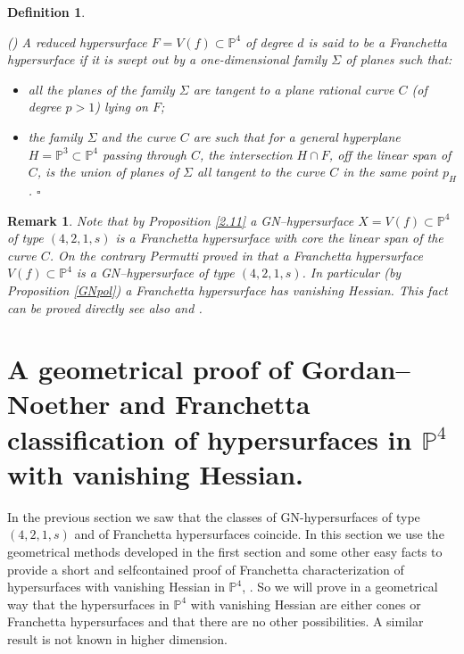 \documentclass[11pt,a4paper]{amsart}
\newtheorem{rem}[theorem]{Remark}
\newtheorem{defi}[theorem]{Definition}
\newcommand{\erem}{\hfill $\square$}
\newcommand{\PP}{ \mathbb{P}}
\begin{document}
\begin{defi}\label{Frhyp}{\em (\cite{Franchetta})
A reduced hypersurface $F=V(f)\subset \mathbb{P}^4$ of degree $d$ is said to be a {\it Franchetta hypersurface} if it is
swept out by a one-dimensional family $\Sigma$ of planes such
that:
\begin{itemize}
\item all the planes of the family $\Sigma$ are tangent to a plane
rational curve $C$  (of degree $p>1$) lying on $F$; \item the
family $\Sigma$ and the curve $C$ are such that for a general
hyperplane $H=\PP^3\subset\PP^4$ passing through $C$, the
intersection $H\cap F$, off the linear span of $C$, is the union
of planes of $\Sigma$ all tangent to the curve $C$ in the same
point $p_H$. \erem\end{itemize} }\end{defi}

\begin{rem}\label{remark: Franchetta equvalent to GN}{\em
Note that by Proposition \ref{2.11}  a GN--hypersurface
$X=V(f)\subset\mathbb{P}^4$ of type $(4,2,1,s)$ is a Franchetta
hypersurface with core the linear span of the curve $C$. On the
contrary Permutti proved in \cite{Permutti1} that  a Franchetta
hypersurface $V(f)\subset\mathbb{P}^4$ is a GN--hypersurface of
type $(4,2,1,s)$. In particular (by Proposition \ref{GNpol}) a
Franchetta hypersurface has vanishing Hessian. This fact can be
proved directly see also \cite{Permutti1} and \cite[Proposition
2.18]{CilibertoRussoSimis}.}\end{rem}

\section{A geometrical proof of Gordan--Noether and Franchetta classification of hypersurfaces in $\mathbb{P}^4$ with vanishing Hessian.}
In the previous section we saw that the classes of
GN-hypersurfaces of type $(4,2,1,s)$ and of Franchetta
hypersurfaces coincide. In this section we use the geometrical
methods developed in the first section and some other easy facts
to provide a short and selfcontained proof of Franchetta
characterization of hypersurfaces with vanishing Hessian in
$\mathbb{P}^4$, \cite{Franchetta}. So we will prove in a
geometrical way that the hypersurfaces in $\mathbb{P}^4$ with
vanishing Hessian are either cones or Franchetta hypersurfaces and
that there are no other possibilities. A similar result is not
known in higher dimension.\smallskip
\end{document}
